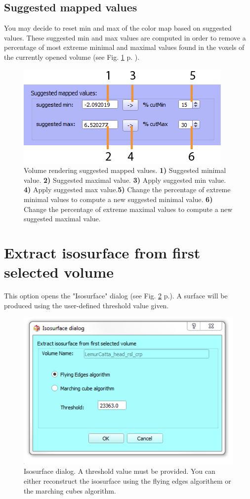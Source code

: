 \subsection{Suggested mapped values}
You may decide to reset min and max of the color map based on suggested values. These suggested min and max values are computed in order to remove a percentage of most extreme minimal and maximal values found in the voxels of the currently opened volume (see Fig. \ref{volume_suggested_values} p. \pageref{volume_suggested_values}).
\begin{figure}
  \centering
  \includegraphics[scale=1]{images/14/volume_suggested_values2.png}
\caption{Volume rendering suggested mapped values. \textbf{1)} Suggested minimal value. \textbf{2)} Suggested maximal value. \textbf{3)} Apply suggested min value.  \textbf{4)} Apply suggested max value.\textbf{5)} Change the percentage of extreme minimal values to compute a new suggested minimal value. \textbf{6)} Change the percentage of extreme maximal values to compute a new suggested maximal value.}	
\label{volume_suggested_values}
 \end{figure}


\section{Extract isosurface from first selected volume}
This option opens the "Isosurface" dialog (see Fig. \ref{isosurface_dialog} p.\pageref{isosurface_dialog}). A surface will be produced using the user-defined threshold value given. 
\begin{figure}
  \centering
  \includegraphics[scale=0.5]{images/14/isosurface/isosurface_dialog.png}
\caption{Isosurface dialog. A threshold value must be provided. You can either reconstruct the isosurface using the flying edges algorithem or the marching cubes algorithm.}	
\label{isosurface_dialog}
 \end{figure}

